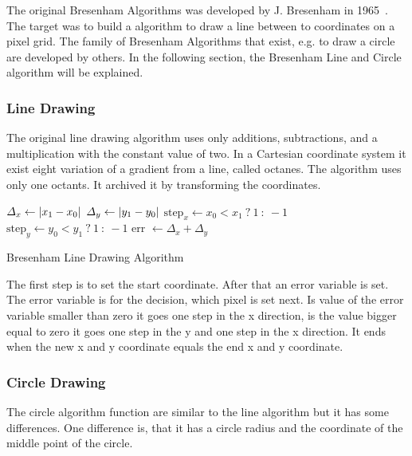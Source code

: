 The original Bresenham Algorithms was developed by J. Bresenham in 1965~\cite{Bresenham65Line}. The target was to build a algorithm to draw a line between to coordinates on a pixel grid. The family of Bresenham Algorithms that exist, e.g. to draw a circle are developed by others. In the following section, the Bresenham Line and Circle algorithm will be explained.
\subsubsection*{Line Drawing}
The original line drawing algorithm uses only additions, subtractions, and a multiplication with the constant value of two. In a Cartesian coordinate system it exist eight variation of a gradient from a line, called octanes. The algorithm uses only one octants. It archived it by transforming the coordinates.

\begin{algorithm}[H]
	\SetAlgoLined
	\(\varDelta_x \gets \lvert x_1 - x_0\rvert\)\;
	\(\varDelta_y \gets \lvert y_1 - y_0\rvert\)\;
	\(\text{step}_x \gets x_0 < x_1~ ? ~1 ~:~ -1 \)\;
	\(\text{step}_y \gets y_0 < y_1~ ?~ 1 ~:~ -1\)\;
	err \( \gets \varDelta_x + \varDelta_y \)	
	\caption{Bresenham Line Drawing Algorithm}
	\label{alg:bresline}
\end{algorithm}

The first step is to set the start coordinate. After that an error variable is set. The error variable is for the decision, which pixel is set next. Is value of the error variable smaller than zero it goes one step in the x direction, is the value bigger equal to zero it goes one step in the y and one step in the x direction. It ends when the new x and y coordinate equals the end x and y coordinate.
 
\subsubsection*{Circle Drawing}
The circle algorithm function are similar to the line algorithm but it has some differences. One difference is, that it has a circle radius and the coordinate of the middle point of the circle.